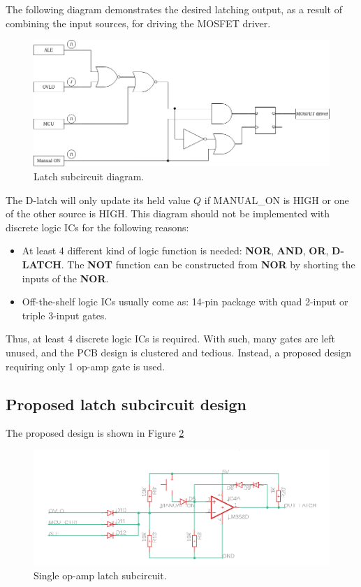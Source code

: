 \documentclass[../main.tex]{subfiles}
\begin{document}
    \justify
    The following diagram demonstrates the desired latching output, as a result of combining the input sources, for driving the MOSFET driver.

    \begin{figure}[!h]
        \centerline{\includegraphics[width=\linewidth]{media/latch_circuit_diagram.png}}
        \caption{Latch subcircuit diagram.}
        \label{fig:latch_circuit_diagram}
    \end{figure} 

    \justify
    The D-latch will only update its held value $Q$ if MANUAL\_ON is HIGH or one of the other source is HIGH. This diagram should not be implemented with discrete logic ICs for the following reasons:
    \begin{itemize}
        \item At least 4 different kind of logic function is needed: \textbf{NOR}, \textbf{AND}, \textbf{OR}, \textbf{D-LATCH}. The \textbf{NOT} function can be constructed from \textbf{NOR} by shorting the inputs of the \textbf{NOR}.
        \item Off-the-shelf logic ICs usually come as: 14-pin package with quad 2-input or triple 3-input gates.
    \end{itemize}

    \justify
    Thus, at least 4 discrete logic ICs is required. With such, many gates are left unused, and the PCB design is clustered and tedious. Instead, a proposed design requiring only 1 op-amp gate is used.

    \pagebreak
    \subsection{Proposed latch subcircuit design} \label{ssec:proposed_latch_design}
    The proposed design is shown in Figure \ref{fig:op_amp_latch_circuit}

    \begin{figure}[!h]
        \centerline{\includegraphics[width=\linewidth]{media/op_amp_latch_circuit.png}}
        \caption{Single op-amp latch subcircuit.}
        \label{fig:op_amp_latch_circuit}
    \end{figure} 
\end{document}
